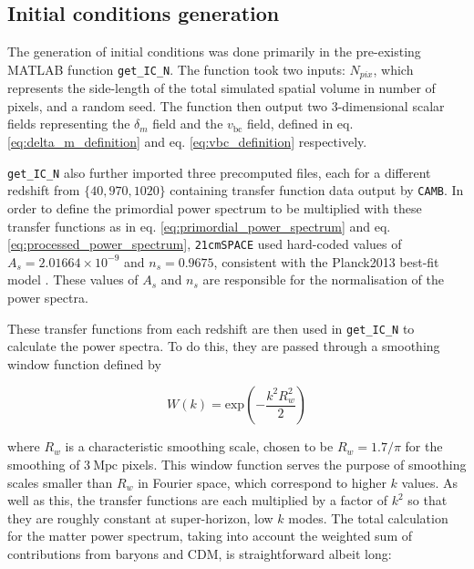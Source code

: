 \documentclass[floats,floatfix,showpacs,amssymb,prd,superscriptaddress,nofootinbib]{revtex4-2} %
\newcommand{\code}{\texttt}
\newcommand{\red}{\textcolor{red}}
\begin{document}



\subsection{Initial conditions generation}

The generation of initial conditions was done primarily in the pre-existing MATLAB function \code{get\_IC\_N}. The function took two inputs: $N_{pix}$, which represents the side-length of the total simulated spatial volume in number of pixels, and a random seed. The function then output two 3-dimensional scalar fields representing the $\delta_m$ field and the $v_{\text{bc}}$ field, defined in eq. \ref{eq:delta_m_definition} and eq. \ref{eq:vbc_definition} respectively.

\code{get\_IC\_N} also further imported three precomputed files, each for a different redshift from $\{40, 970, 1020\}$ containing transfer function data output by \code{CAMB}. In order to define the primordial power spectrum to be multiplied with these transfer functions as in eq. \ref{eq:primordial_power_spectrum} and eq. \ref{eq:processed_power_spectrum}, \code{21cmSPACE} used hard-coded values of $A_s = 2.01664 \times 10^{-9}$ and $n_s = 0.9675$, consistent with the Planck2013 best-fit model \citep{Planck2013results}. These values of $A_s$ and $n_s$ are responsible for the normalisation of the power spectra.

These transfer functions from each redshift are then used in \code{get\_IC\_N} to calculate the power spectra. To do this, they are  passed through a smoothing window function defined by 

\begin{equation}
    W(k) = \text{exp}\left( -\frac{k^2 R_w ^2}{2} \right)
\end{equation}

\noindent where $R_w$ is a characteristic smoothing scale, chosen to be $R_w = 1.7 / \pi$ for the smoothing of $3 ~\text{Mpc}$ pixels. 
This window function serves the purpose of smoothing scales smaller than $R_w$ in Fourier space, which correspond to higher $k$ values. As well as this, the transfer functions are each multiplied by a factor of $k^2$ so that they are roughly constant at super-horizon, low $k$ modes. The total calculation for the matter power spectrum, taking into account the weighted sum of contributions from baryons and CDM, is straightforward albeit long:
\end{document}
